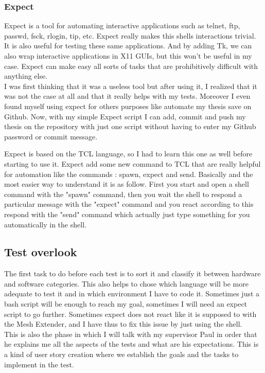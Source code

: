 \subsubsection{Expect}
Expect is a tool for automating interactive applications such as telnet, ftp, passwd, fsck, rlogin, tip, etc. Expect really makes this shells interactions trivial. It is also useful for testing these same applications. And by adding Tk, we can also wrap interactive applications in X11 GUIs, but this won't be useful in my case. Expect can make easy all sorts of tasks that are prohibitively difficult with anything else.\\
I was first thinking that it was a useless tool but after using it, I realized that it was not the case at all and that it really helps with my tests. Moreover I even found myself using expect for others purposes like automate my thesis save on Github. Now, with my simple Expect script I can add, commit and push my thesis on the repository with just one script without having to enter my Github password or commit message. 
\par
Expect is based on the TCL language, so I had to learn this one as well before starting to use it. Expect add some new command to TCL that are really helpful for automation like the commands : spawn, expect and send. Basically and the most easier way to understand it is as follow. First you start and open a shell command with the "spawn" command, then you wait the shell to respond a particular message with the "expect" command and you react according to this respond with the "send" command which actually just type something for you automatically in the shell. 

\subsection{Test overlook}
The first task to do before each test is to sort it and classify it between hardware and software categories. This also helps to chose which language will be more adequate to test it and in which environment I have to code it. Sometimes just a bash script will be enough to reach my goal, sometimes I will need an expect script to go further. Sometimes expect does not react like it is supposed to with the Mesh Extender, and I have thus to fix this issue by just using the shell. \\
This is also the phase in which I will talk with my supervisor Paul in order that he explains me all the aspects of the tests and what are his expectations. This is a kind of user story creation where we establish the goals and the tasks to implement in the test.

